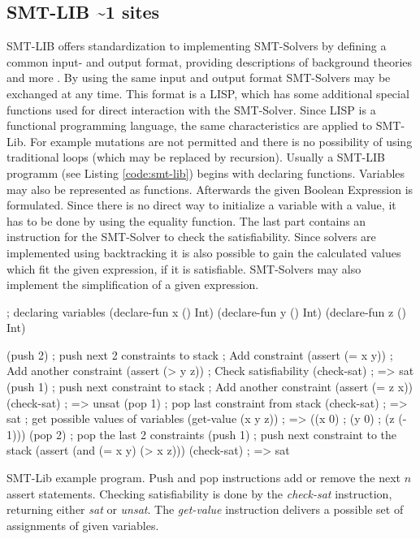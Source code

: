 \subsection{SMT-LIB \textasciitilde 1 sites}
SMT-LIB offers standardization to implementing SMT-Solvers by defining a common input- and output format, providing descriptions of background theories and more \cite{cokSMTLIBv2LanguageTools}. %
By using the same input and output format SMT-Solvers may be exchanged at any time. 
This format is a LISP, which has some additional special functions used for direct interaction with the SMT-Solver. Since LISP is a functional programming language, the same characteristics are applied to SMT-Lib.
For example mutations are not permitted and there is no possibility of using traditional loops (which may be replaced by recursion).
Usually a SMT-LIB programm (see Listing \ref{code:smt-lib}) begins with declaring functions. Variables may also be represented as functions. 
Afterwards the given Boolean Expression is formulated. Since there is no direct way to initialize a variable with a value, it has to be done by using the equality function. 
The last part contains an instruction for the SMT-Solver to check the satisfiability. 
Since solvers are implemented using backtracking it is also possible to gain the calculated values which fit the given expression, if it is satisfiable. 
SMT-Solvers may also implement the simplification of a given expression.

\begin{program}
	\begin{LispCode}
; declaring variables
(declare-fun x () Int)
(declare-fun y () Int)
(declare-fun z () Int)

(push 2) ; push next 2 constraints to stack
; Add constraint
(assert (= x y))
; Add another constraint
(assert (> y z))
; Check satisfiability
(check-sat)
; => sat
(push 1) ; push next constraint to stack
; Add another constraint
(assert (= z x))
(check-sat)
; => unsat
(pop 1) ; pop last constraint from stack
(check-sat)
; => sat
; get possible values of variables
(get-value (x y z))
; => ((x 0)
;     (y 0)
;     (z (- 1)))
(pop 2) ; pop the last 2 constraints
(push 1) ; push next constraint to the stack
(assert (and (= x y) (> x z)))
(check-sat)
; => sat\end{LispCode}
	\caption{SMT-Lib example program. Push and pop instructions add or remove the next $n$ assert statements. Checking satisfiability is done by the \emph{check-sat} instruction, returning either \emph{sat} or \emph{unsat}. The \emph{get-value} instruction delivers a possible set of assignments of given variables. }
	\label{code:smt-lib}
\end{program}




